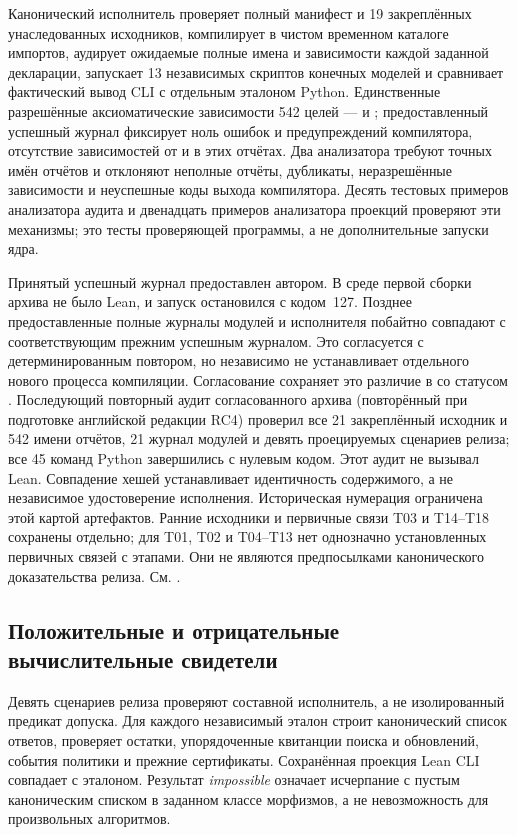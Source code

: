 Канонический исполнитель проверяет полный манифест и 19 закреплённых унаследованных исходников, компилирует в чистом временном каталоге импортов, аудирует ожидаемые полные имена и зависимости каждой заданной декларации, запускает 13 независимых скриптов конечных моделей и сравнивает фактический вывод CLI с отдельным эталоном Python. Единственные разрешённые аксиоматические зависимости 542 целей ---  и ; предоставленный успешный журнал фиксирует ноль ошибок и предупреждений компилятора, отсутствие зависимостей от  и  в этих отчётах. Два анализатора требуют точных имён отчётов и отклоняют неполные отчёты, дубликаты, неразрешённые зависимости и неуспешные коды выхода компилятора. Десять тестовых примеров анализатора аудита и двенадцать примеров анализатора проекций проверяют эти механизмы; это тесты проверяющей программы, а не дополнительные запуски ядра.

Принятый успешный журнал предоставлен автором. В среде первой сборки архива не было Lean, и запуск остановился с кодом~127. Позднее предоставленные полные журналы модулей и исполнителя побайтно совпадают с соответствующим прежним успешным журналом. Это согласуется с детерминированным повтором, но независимо не устанавливает отдельного нового процесса компиляции. Согласование сохраняет это различие в  со статусом . Последующий повторный аудит согласованного архива (повторённый при подготовке английской редакции RC4) проверил все 21 закреплённый исходник и 542 имени отчётов, 21 журнал модулей и девять проецируемых сценариев релиза; все 45 команд Python завершились с нулевым кодом. Этот аудит не вызывал Lean. Совпадение хешей устанавливает идентичность содержимого, а не независимое удостоверение исполнения. Историческая нумерация ограничена этой картой артефактов. Ранние исходники и первичные связи T03 и T14--T18 сохранены отдельно; для T01, T02 и T04--T13 нет однозначно установленных первичных связей с этапами. Они не являются предпосылками канонического доказательства релиза. См. .

\clearpage
\subsection{Положительные и отрицательные вычислительные свидетели}
Девять сценариев релиза проверяют составной исполнитель, а не изолированный предикат допуска. Для каждого независимый эталон строит канонический список ответов, проверяет остатки, упорядоченные квитанции поиска и обновлений, события политики и прежние сертификаты. Сохранённая проекция Lean CLI совпадает с эталоном. Результат \emph{impossible} означает исчерпание с пустым каноническим списком в заданном классе морфизмов, а не невозможность для произвольных алгоритмов.

